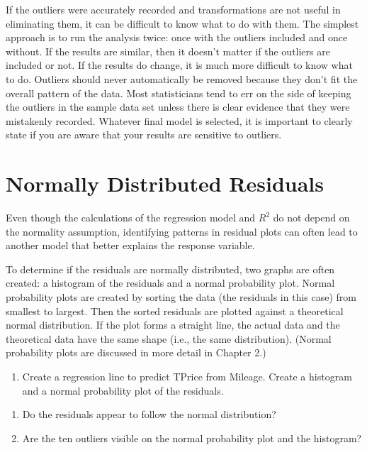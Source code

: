 \documentclass[
]{report}
\providecommand{\tightlist}{%
  \setlength{\itemsep}{0pt}\setlength{\parskip}{0pt}}
\begin{document}
If the outliers were accurately recorded and transformations are not useful in eliminating them, it can be difficult to know what to do with them. The simplest approach is to run the analysis twice: once with the outliers included and once without. If the results are similar, then it doesn't matter if the outliers are included or not. If the results do change, it is much more difficult to know what to do. Outliers should never automatically be removed because they don't fit the overall pattern of the data. Most statisticians tend to err on the side of keeping the outliers in the sample data set unless there is clear evidence that they were mistakenly recorded. Whatever final model is selected, it is important to clearly state if you are aware that your results are sensitive to outliers.

\section*{Normally Distributed Residuals}\label{normally-distributed-residuals}

Even though the calculations of the regression model and \(R^2\) do not depend on the normality assumption, identifying patterns in residual plots can often lead to another model that better explains the response variable.

To determine if the residuals are normally distributed, two graphs are often created: a histogram of the residuals and a normal probability plot. Normal probability plots are created by sorting the data (the residuals in this case) from smallest to largest. Then the sorted residuals are plotted against a theoretical normal distribution. If the plot forms a straight line, the actual data and the theoretical data have the same shape (i.e., the same distribution). (Normal probability plots are discussed in more detail in
Chapter 2.)

\begin{enumerate}
\def\labelenumi{\arabic{enumi}.}
\setcounter{enumi}{12}
\tightlist
\item
  Create a regression line to predict TPrice from Mileage. Create a histogram and a normal probability plot of the residuals.
\end{enumerate}

\begin{enumerate}
\def\labelenumi{\alph{enumi}.}
\item
  Do the residuals appear to follow the normal distribution?
\item
  Are the ten outliers visible on the normal probability plot and the histogram?
\end{enumerate}
\end{document}
